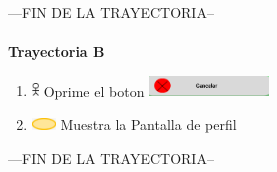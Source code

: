 ---FIN DE LA TRAYECTORIA--\\\\
\textbf{Trayectoria B}
    \begin{enumerate}
        \item \includegraphics[width=0.0150\textwidth]{Figuras/persona.png} Oprime el boton \includegraphics[width=0.25\textwidth]{ComponentesCU/img3.png}
        \item \includegraphics[width=0.0500\textwidth]{Figuras/sistema.png} Muestra la Pantalla de perfil
    \end{enumerate}
---FIN DE LA TRAYECTORIA--
\newpage

